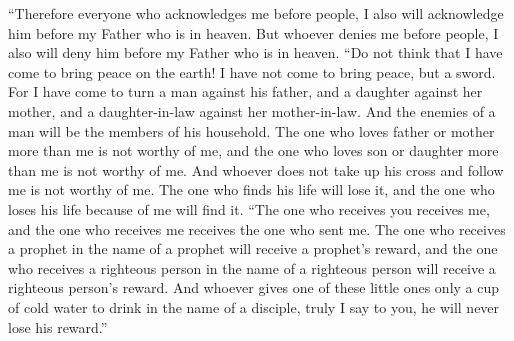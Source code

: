 \begin{biblechapter}
\verse “Therefore everyone who acknowledges me before people, I also will acknowledge him before my Father who is in heaven.
\verse But whoever denies me before people, I also will deny him before my Father who is in heaven.
 “Do not think that I have come to bring peace on the earth! I have not come to bring peace, but a sword.
\verse For I have come to turn a man against his father, and a daughter against her mother, and a daughter-in-law against her mother-in-law.
\verse And the enemies of a man will be the members of his household.
\verse The one who loves father or mother more than me is not worthy of me, and the one who loves son or daughter more than me is not worthy of me.
\verse And whoever does not take up his cross and follow me is not worthy of me.
\verse The one who finds his life will lose it, and the one who loses his life because of me will find it.
 “The one who receives you receives me, and the one who receives me receives the one who sent me.
\verse The one who receives a prophet in the name of a prophet will receive a prophet’s reward, and the one who receives a righteous person in the name of a righteous person will receive a righteous person’s reward.
\verse And whoever gives one of these little ones only a cup of cold water to drink in the name of a disciple, truly I say to you, he will never lose his reward.”
\end{biblechapter}

